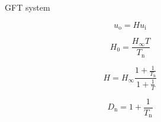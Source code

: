 \documentclass{article}[11pt]
\begin{document}
\notetitle

\cite{middlebrook-ndieet-89, middlebrook-gft-02, middlebrook-gft-06}

\begin{figure}[H]
  \centering
  \begin{tikzpicture}
    
  \end{tikzpicture}
  \caption{GFT system}
  \label{fig:gft}
\end{figure}

\begin{equation}
u_{\mathrm{o}}= H u_{\mathrm{i}}
\end{equation}

\begin{equation}
H_{\mathrm{0}} = \frac{H_{\infty} T}{T_{\mathrm{n}}}
\end{equation}

\begin{equation}
H = H_{\infty} \frac{1+\frac{1}{T_{\mathrm{n}}}}{1+\frac{1}{T}}
\end{equation}

\begin{equation}
D_{\mathrm{n}} = 1+\frac{1}{T_{\mathrm{n}}}
\end{equation}

\printbibliography
\end{document}
